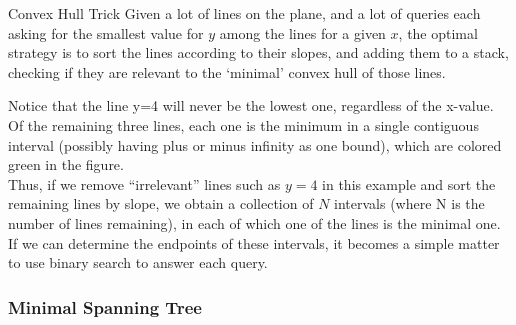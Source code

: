 {Convex Hull Trick}{
    Given a lot of lines on the plane, and a lot of queries each asking for
    the smallest value for $ y $ among the lines for a given $ x $, the
    optimal strategy is to sort the lines according to their slopes, and
    adding them to a stack, checking if they are relevant to the `minimal'
    convex hull of those lines.
}
\begin{minipage}{.55\linewidth}
    Notice that the line y=4 will never be the
    lowest one, regardless of the x-value. Of the remaining three lines, each
    one is the minimum in a single contiguous interval (possibly having plus
    or minus infinity as one bound), which are colored green in the figure.
    \\[1em]

    Thus, if we remove ``irrelevant'' lines such as $y=4$ in this example
    and sort the remaining lines by slope, we obtain a collection of $N$ intervals
    (where N is the number of lines remaining), in each of which one of the lines
    is the minimal one. If we can determine the endpoints of these intervals, it
    becomes a simple matter to use binary search to answer each query.
\end{minipage}\hfill%
\begin{minipage}{.4\linewidth}
\end{minipage}


\subsubsection{Minimal Spanning Tree}


\begin{minipage}{.5\linewidth}
\end{minipage}\hfill%
\begin{minipage}{.4\linewidth}
\end{minipage}




